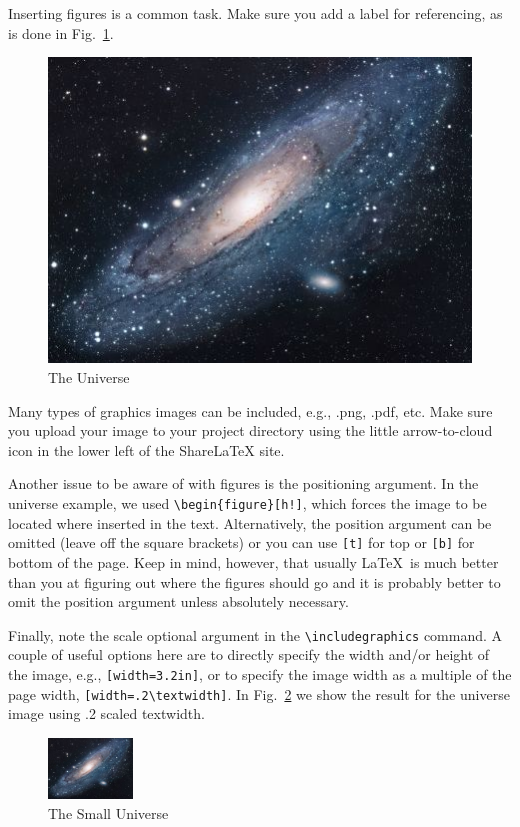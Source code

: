 \documentclass[12pt,letterpaper]{article}
\begin{document}
Inserting figures is a common task.  Make sure you add a label for referencing, as is done in Fig.~\ref{fig:universe}.

\begin{figure}[h!]
\centering
\includegraphics[scale=1.7]{universe.jpg}
\caption{The Universe}
\label{fig:universe}
\end{figure}

Many types of graphics images can be included, e.g., .png, .pdf, etc.  Make sure you upload your image to your project directory using the little arrow-to-cloud icon in the lower left of the ShareLaTeX site.

Another issue to be aware of with figures is the positioning argument.  In the universe example, we used \verb=\begin{figure}[h!]=, which forces the image to be located where inserted in the text.  Alternatively, the position argument can be omitted (leave off the square brackets) or you can use \verb=[t]= for top or \verb=[b]= for bottom of the page.  Keep in mind, however, that usually \LaTeX~is much better than you at figuring out where the figures should go and it is probably better to omit the position argument unless absolutely necessary.

Finally, note the scale optional argument in the \verb=\includegraphics= command.  A couple of useful options here are to directly specify the width and/or height of the image, e.g., \verb/[width=3.2in]/, or to specify the image width as a multiple of the page width, \verb/[width=.2\textwidth]/.  In Fig.~\ref{fig:smalluniverse} we show the result for the universe image using .2 scaled textwidth.

\begin{figure}
\centering
\includegraphics[width=0.2\textwidth]{universe.jpg}
\caption{The Small Universe}
\label{fig:smalluniverse}
\end{figure}
\end{document}
